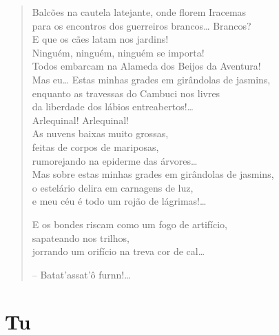 \begin{verse}
Balcões na cautela latejante, onde florem Iracemas\\
para os encontros dos guerreiros brancos\ldots{} Brancos?\\
E que os cães latam nos jardins!\\
Ninguém, ninguém, ninguém se importa!\\
Todos embarcam na Alameda dos Beijos da Aventura!\\
Mas eu\ldots{} Estas minhas grades em girândolas de jasmins,\\
enquanto as travessas do Cambuci nos livres\\
da liberdade dos lábios entreabertos!\ldots{}\\
Arlequinal! Arlequinal!\\
As nuvens baixas muito grossas,\\
feitas de corpos de mariposas,\\
rumorejando na epiderme das árvores\ldots{}\\
Mas sobre estas minhas grades em girândolas de jasmins,\\
o estelário delira em carnagens de luz,\\
e meu céu é todo um rojão de lágrimas!\ldots{}

E os bondes riscam como um fogo de artifício,\\
sapateando nos trilhos,\\
jorrando um orifício na treva cor de cal\ldots{}

-- Batat'assat'ô furnn!\ldots{}
\end{verse}

\chapter{Tu}

